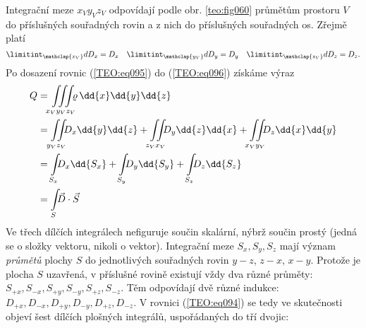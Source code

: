       Integrační meze \(x_Vy_Vz_V\) odpovídají podle obr. \ref{teo:fig060} průmětům prostoru \(V\)
      do příslušných souřadných rovin a z nich do příslušných souřadných os. Zřejmě platí
      \begin{equation}\label{TEO:eq095}
        \limitint_{\mathclap{x_V}}dD_x = D_x \quad
        \limitint_{\mathclap{y_V}}dD_y = D_y \quad
        \limitint_{\mathclap{z_V}}dD_z = D_z.
      \end{equation}
      Po dosazení rovnic (\ref{TEO:eq095}) do (\ref{TEO:eq096}) získáme výraz
      \begin{align}
        Q &= \iiint\limits_{x_Vy_Vz_V}\mspace{-9.0mu}\varrho\,\dd{x}\dd{y}\dd{z}  \nonumber\\ 
          &= \iint\limits_{y_Vz_V}\mspace{-9.0mu}D_x\dd{y}\dd{z} + 
             \iint\limits_{z_Vx_V}\mspace{-9.0mu}D_y\dd{z}\dd{x} + 
             \iint\limits_{x_Vy_V}\mspace{-9.0mu}D_z\dd{x}\dd{y}                  \nonumber\\ 
          &= \int\limits_{S_x}\mspace{-9.0mu}D_x\dd{S_x} + 
             \int\limits_{S_y}\mspace{-9.0mu}D_y\dd{S_y} + 
             \int\limits_{S_z}\mspace{-9.0mu}D_z\dd{S_z}                          \nonumber\\                 
          &= \int\limits_{S}\mspace{-9.0mu}\vec{D}\cdot\vec{S}                    \label{TEO:eq094}
      \end{align}
      Ve třech dílčích integrálech nefiguruje součin skalární, nýbrž součin prostý (jedná se o
      složky vektoru, nikoli o vektor). Integrační meze \(S_x, S_y, S_z\) mají význam \emph{průmětů}
      plochy \(S\) do jednotlivých souřadných rovin \(y-z\), \(z-x\), \(x-y\). Protože je plocha
      \(S\) uzavřená, v příslušné rovině existují vždy dva různé průměty: \(S_{+x}, S_{-x}, S_{+y},
      S_{-y}, S_{+z}, S_{-z}\). Těm odpovídají dvě různé indukce: \(D_{+x}, D_{-x}, D_{+y}, D_{-y},
      D_{+z}, D_{-z}\). V rovnici (\ref{TEO:eq094}) se tedy ve skutečnosti objeví šest dílčích
      plošných integrálů, uspořádaných do tří dvojic:
